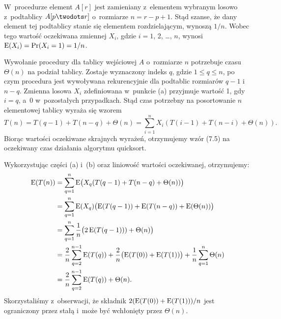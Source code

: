 
\subproblem %
W~procedurze  element $A[r]$ jest zamieniany z~elementem wybranym losowo z~podtablicy $A[p\twodots r]$ o~rozmiarze $n=r-p+1$.
Stąd szanse, że dany element tej podtablicy stanie się elementem rozdzielającym, wynoszą $1/n$.
Wobec tego wartość oczekiwana zmiennej $X_i$, gdzie $i=1$, 2, \dots, $n$, wynosi $\operatorname{E}(X_i)=\Pr(X_i=1)=1/n$.

\subproblem %
Wywołanie procedury  dla tablicy wejściowej $A$ o~rozmiarze $n$ potrzebuje czasu $\Theta(n)$ na podział tablicy.
Zostaje wyznaczony indeks $q$, gdzie $1\le q\le n$, po czym procedura jest wywoływana rekurencyjnie dla podtablic rozmiarów $q-1$ i~$n-q$.
Zmienna losowa $X_i$ zdefiniowana w~punkcie (a) przyjmuje wartość 1, gdy $i=q$, a~0 w~pozostałych przypadkach.
Stąd czas potrzebny na posortowanie $n$\nbhyphen elementowej tablicy wyraża się wzorem
\[
	T(n) = T(q-1)+T(n-q)+\Theta(n) = \sum_{i=1}^nX_i(T(i-1)+T(n-i)+\Theta(n)).
\]
Biorąc wartości oczekiwane skrajnych wyrażeń, otrzymujemy wzór (7.5) na oczekiwany czas działania algorytmu quicksort.

\subproblem %

\noindent Wykorzystując części (a) i~(b) oraz liniowość wartości oczekiwanej, otrzymujemy:
\begin{align*}
	\operatorname{E}(T(n)) &= \sum_{q=1}^n\operatorname{E}\bigl(X_q(T(q-1)+T(n-q)+\Theta(n))\bigr) \\
	&= \sum_{q=1}^n\operatorname{E}(X_q)\bigl(\operatorname{E}(T(q-1))+\operatorname{E}(T(n-q))+\operatorname{E}(\Theta(n))\bigr) \\
	&= \sum_{q=1}^n\frac{1}{n}\bigl(2\operatorname{E}(T(q-1)))+\Theta(n)\bigr) \\
	&= \frac{2}{n}\sum_{q=2}^{n-1}\operatorname{E}(T(q))+\frac{2}{n}\bigl(\operatorname{E}(T(0))+\operatorname{E}(T(1))\bigr)+\frac{1}{n}\sum_{q=1}^n\Theta(n) \\
	&= \frac{2}{n}\sum_{q=2}^{n-1}\operatorname{E}(T(q))+\Theta(n).
\end{align*}
Skorzystaliśmy z~obserwacji, że składnik $2(\operatorname{E}(T(0))+\operatorname{E}(T(1)))/n$ jest ograniczony przez stałą i~może być wchłonięty przez $\Theta(n)$.

\subproblem %

